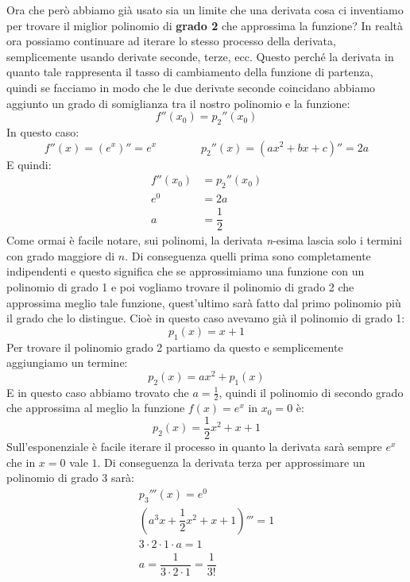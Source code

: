 Ora che però abbiamo già usato sia un limite che una derivata cosa ci inventiamo per trovare il miglior polinomio di \textbf{grado 2} che approssima la funzione? In realtà ora possiamo continuare ad iterare lo stesso processo della derivata, semplicemente usando derivate seconde, terze, ecc. Questo perché la derivata in quanto tale rappresenta il tasso di cambiamento della funzione di partenza, quindi se facciamo in modo che le due derivate seconde coincidano abbiamo aggiunto un grado di somiglianza tra il nostro polinomio e la funzione:
\begin{equation*}
	f''(x_0) = p_2''(x_0)
\end{equation*}
In questo caso:
\begin{equation*}
	f''(x) = (e^x)'' = e^x \qquad \qquad p_2''(x) = (ax^2 + bx + c)'' = 2a
\end{equation*}
E quindi:
\begin{align*}
	f''(x_0) &= p_2''(x_0)\\
	e^{0} & = 2a\\
	a & = \dfrac{1}{2}
\end{align*}
Come ormai è facile notare, sui polinomi, la derivata \textit{n}-esima lascia solo i termini con grado maggiore di $n$. Di conseguenza quelli prima sono completamente indipendenti e questo significa che se approssimiamo una funzione con un polinomio di grado 1 e poi vogliamo trovare il polinomio di grado 2 che approssima meglio tale funzione, quest'ultimo sarà fatto dal primo polinomio più il grado che lo distingue. Cioè in questo caso avevamo già il polinomio di grado 1: 
\begin{equation*}
	p_1(x) = x + 1
\end{equation*}
Per trovare il polinomio grado 2 partiamo da questo e semplicemente aggiungiamo un termine:
\begin{equation*}
	p_2(x) = ax^2 + p_1(x)
\end{equation*}
E in questo caso abbiamo trovato che $a = \frac{1}{2}$, quindi il polinomio di secondo grado che approssima al meglio la funzione $f(x) = e^x$ in $x_0 = 0$ è:
\begin{equation*}
	p_2(x) = \dfrac{1}{2}x^2 + x + 1
\end{equation*}
Sull'esponenziale è facile iterare il processo in quanto la derivata sarà sempre $e^x$ che in $x = 0$ vale $1$. Di conseguenza la derivata terza per approssimare un polinomio di grado 3 sarà:
\begin{gather*}
	p_3'''(x) = e^0\\
	(a^3x + \dfrac{1}{2}x^2 + x + 1)''' = 1\\
	3 \cdot 2 \cdot 1 \cdot a = 1\\
	a = \dfrac{1}{3 \cdot 2 \cdot 1} = \dfrac{1}{3!}
\end{gather*}
